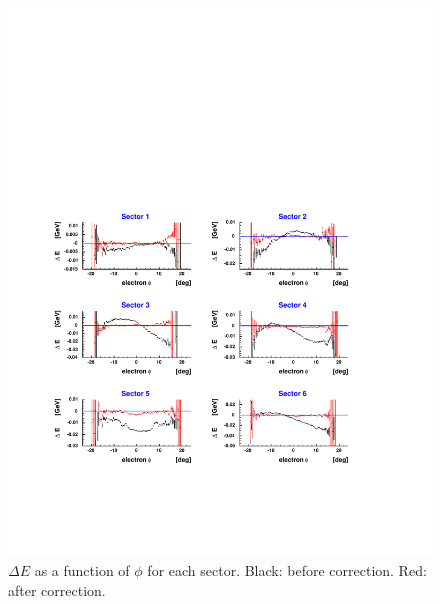 \begin{figure}[h]
 \begin{center}
 \includegraphics[width = 14cm, bb=30 120 550 570]{data_reduction/kine_corr/img/angle_result}
  \caption[$\Delta E$  as a function of $\phi$ for each sector]
          { $\Delta E$  as a function of $\phi$ for each sector. Black: before correction. Red: after correction. }
 \label{fig:angle_result}
 \end{center}
\end{figure}




\clearpage
\newpage


